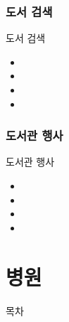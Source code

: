\documentclass[aspectratio=1610,17pt,xcolor=pdftex,dvipsnames,table,handout]{beamer}
\begin{document}
		\section{도서 검색}
		

		\begin{frame} [t,plain]
			\begin{block} {도서 검색}
			\begin{itemize}
				\item 
				\item 
				\item 
				\item 
			\end{itemize}
			\end{block}
		\end{frame}

		\section{도서관 행사}
		

		\begin{frame} [t,plain]
			\begin{block} {도서관 행사}
			\begin{itemize}
				\item 
				\item 
				\item 
				\item 
			\end{itemize}
			\end{block}
		\end{frame}

		\part{병원 }
		\frame{\partpage}


		\begin{frame} [plain]{목차}
		\tableofcontents
		\end{frame}
		
\end{document}
